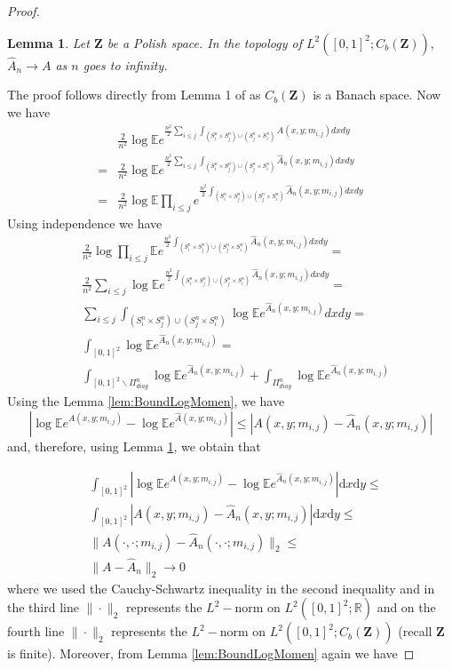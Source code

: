 \documentclass[12pt,twoside,a4paper]{article}
\newtheorem{lemma}[theorem]{Lemma}
\def\R{\mathbb{R}}
\def\E{\mathbb{E}}
\newcommand{\SquareDiag}{{\Pi^n_{diag}}}
\newcommand{\SquareUnion}{{(S^n_i\times S^n_j)\cup (S^n_j\times S^n_i)}}
\newcommand{\Space}{\mathbf{Z}}
\newcommand{\CbFunct}{C_b(\Space)}
\newcommand{\EE}{\mathbb{E}}
\begin{document}
\begin{proof}
\begin{lemma}\label{lemm:L2approx}
Let $\Space$ be a Polish space. In the topology of $L^2([0,1]^2;\CbFunct),$ $\hat{A}_n\to A$ as $n$ goes to infinity.
\end{lemma}
\proof
The proof follows directly from Lemma 1 of \cite[Page 67-68]{diestel1977vector} as $\CbFunct$ is a Banach space. 
\endproof
Now we have 
\[
\begin{split}
    &\frac{2}{n^2}\log \E e^{\frac{n^2}{2}\sum_{i\leq j}\int_{\SquareUnion}A(x,y;m_{i,j}) dx dy}\\=&\frac{2}{n^2}\log \E e^{\frac{n^2}{2}\sum_{i\leq j}\int_{\SquareUnion}\widehat{A}_n(x,y;m_{i,j}) dx dy}\\
    =&\frac{2}{n^2}\log\E \prod_{i\leq j}e^{\frac{n^2}{2}\int_{\SquareUnion}\widehat{A}_n(x,y;m_{i,j}) dx dy}
\end{split}
\]
Using independence we have
\[
\begin{split}
    &\frac{2}{n^2}\log \prod_{i\leq j}\EE  e^{\frac{n^2}{2}\int_{\SquareUnion}\widehat{A}_n(x,y;m_{i,j}) dx dy}=\\
    &\frac{2}{n^2}\sum_{i\leq j}\log \EE  e^{\frac{n^2}{2}\int_{\SquareUnion}\widehat{A}_n(x,y;m_{i,j}) dx dy}=\\
    &\sum_{i\leq j}\int_{\SquareUnion}\log \EE e^{\widehat{A}_n(x,y;m_{i,j})}dx dy=\\
    &\int_{[0,1]^2}\log \EE e^{\widehat{A}_n(x,y;m_{i,j})}=\\
    &\int_{[0,1]^2\backslash \SquareDiag}\log \EE e^{\widehat{A}_n(x,y;m_{i,j})}+ \int_{ \SquareDiag}\log \EE e^{\widehat{A}_n(x,y;m_{i,j})}
\end{split}
\]
Using the Lemma \ref{lem:BoundLogMomen}, we have 
\[|\log\EE e^{A(x,y;m_{i,j})}-\log\EE e^{\hat{A}(x,y;m_{i,j})}|\leq|A(x,y;m_{i,j})-\widehat{A}_n(x,y;m_{i,j})|\]
and, therefore, using Lemma \ref{lemm:L2approx}, we obtain that 

\[
\begin{aligned}
&\int_{[0,1]^2}|\log\EE e^{A(x,y;m_{i,j})}-\log\EE e^{\widehat{A}_n(x,y;m_{i,j})}|\mathrm{d}x\mathrm{d}y\leq \\ & \int_{[0,1]^2}|A(x,y;m_{i,j})-\widehat{A}_n(x,y;m_{i,j})|\mathrm{d}x\mathrm{d}y\leq\\ & \|A(\cdot,\cdot;m_{i,j})-\widehat{A}_n(\cdot,\cdot;m_{i,j})\|_2 \leq \\ & \|A-\widehat{A}_n\|_2\rightarrow 0    
\end{aligned}
\]
where we used the Cauchy-Schwartz inequality in the second inequality and in the third line $\|\cdot\|_2$ represents the $L^2-$norm on $L^2([0,1]^2;\R)$ and on the fourth line $\|\cdot\|_2$ represents the $L^2-$norm on $L^2([0,1]^2;\CbFunct)$ (recall $\Space$ is finite). Moreover, from Lemma \ref{lem:BoundLogMomen} again we have 


\end{proof}
\end{document}
